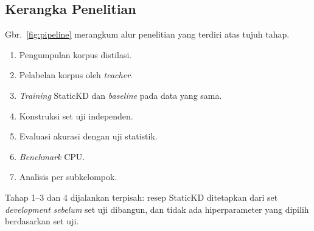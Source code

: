 \documentclass[journal]{IEEEtran}
\newcommand{\eng}[1]{\textit{#1}}   %
\begin{document}
\subsection{Kerangka Penelitian}
Gbr.~\ref{fig:pipeline} merangkum alur penelitian yang terdiri atas tujuh tahap.
\begin{enumerate}
  \item Pengumpulan korpus distilasi.
  \item Pelabelan korpus oleh \eng{teacher}.
  \item \eng{Training} StaticKD dan \eng{baseline} pada data yang sama.
  \item Konstruksi set uji independen.
  \item Evaluasi akurasi dengan uji statistik.
  \item \eng{Benchmark} CPU.
  \item Analisis per subkelompok.
\end{enumerate}
Tahap 1--3 dan 4 dijalankan terpisah: resep StaticKD ditetapkan dari set \eng{development} \emph{sebelum} set uji dibangun, dan tidak ada hiperparameter yang dipilih berdasarkan set uji.
\end{document}
